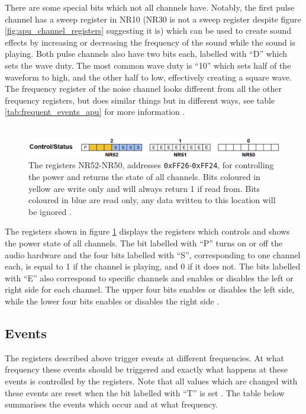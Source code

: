 There are some special bits which not all channels have. Notably, the first pulse channel has a sweep register in NR10 (NR30 is not a sweep register despite figure \ref{fig:apu_channel_registers} suggesting it is) which can be used to create sound effects by increasing or decreasing the frequency of the sound while the sound is playing. Both pulse channels also have two bits each, labelled with ``D'' which sets the wave duty. The most common wave duty is ``10'' which sets half of the waveform to high, and the other half to low, effectively creating a square wave. The frequency register of the noise channel looks different from all the other frequency registers, but does similar things but in different ways, see table \ref{tab:frequent_events_apu} for more information \cite{AudioHardware}.
\\\\     
\begin{figure}[H]
    \centering
    \includegraphics[width=\linewidth]{figures/APU/master_control_apu.png}
    \caption{The registers NR52-NR50, addresses \texttt{0xFF26}-\texttt{0xFF24}, for controlling the power and returns the state of all channels. Bits coloured in yellow are write only and will always return 1 if read from. Bits coloured in blue are read only, any data written to this location will be ignored \cite{AudioHardware}.}
    \label{fig:apu_master_control}
\end{figure}

The registers shown in figure \ref{fig:apu_master_control} displays the registers which controls and shows the power state of all channels. The bit labelled with ``P'' turns on or off the audio hardware and the four bits labelled with ``S'', corresponding to one channel each, is equal to 1 if the channel is playing, and 0 if it does not. The bits labelled with ``E'' also correspond to specific channels and enables or disables the left or right side for each channel. The upper four bits enables or disables the left side, while the lower four bits enables or disables the right side \cite{AudioHardware}.

\subsection{Events}
The registers described above trigger events at different frequencies. At what frequency these events should be triggered and exactly what happens at these events is controlled by the registers. Note that all values which are changed with these events are reset when the bit labelled with ``T'' is set \cite{AudioHardware}. The table below summarises the events which occur and at what frequency.
            
